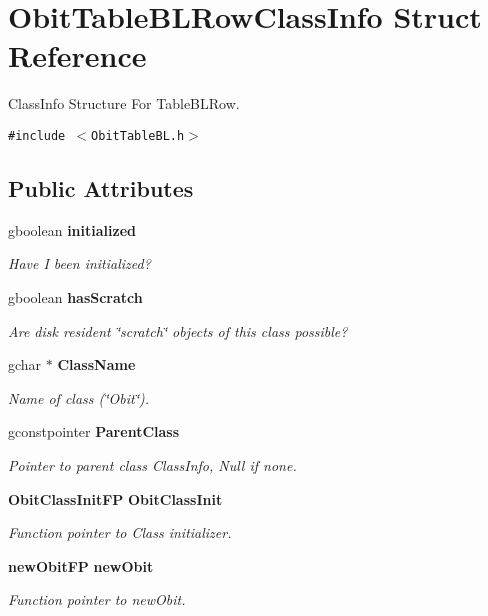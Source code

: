 \section{Obit\-Table\-BLRow\-Class\-Info Struct Reference}
\label{structObitTableBLRowClassInfo}
Class\-Info Structure For Table\-BLRow.  


{\tt \#include $<$Obit\-Table\-BL.h$>$}

\subsection*{Public Attributes}
\begin{CompactItemize}
\item 
gboolean {\bf initialized}
\begin{CompactList}\small\item\em Have I been initialized? \item\end{CompactList}\item 
gboolean {\bf has\-Scratch}
\begin{CompactList}\small\item\em Are disk resident \char`\"{}scratch\char`\"{} objects of this class possible? \item\end{CompactList}\item 
gchar $\ast$ {\bf Class\-Name}
\begin{CompactList}\small\item\em Name of class (\char`\"{}Obit\char`\"{}). \item\end{CompactList}\item 
gconstpointer {\bf Parent\-Class}
\begin{CompactList}\small\item\em Pointer to parent class Class\-Info, Null if none. \item\end{CompactList}\item 
{\bf Obit\-Class\-Init\-FP} {\bf Obit\-Class\-Init}
\begin{CompactList}\small\item\em Function pointer to Class initializer. \item\end{CompactList}\item 
{\bf new\-Obit\-FP} {\bf new\-Obit}
\begin{CompactList}\small\item\em Function pointer to new\-Obit. \item\end{CompactList}\item 

\end{CompactItemize}
